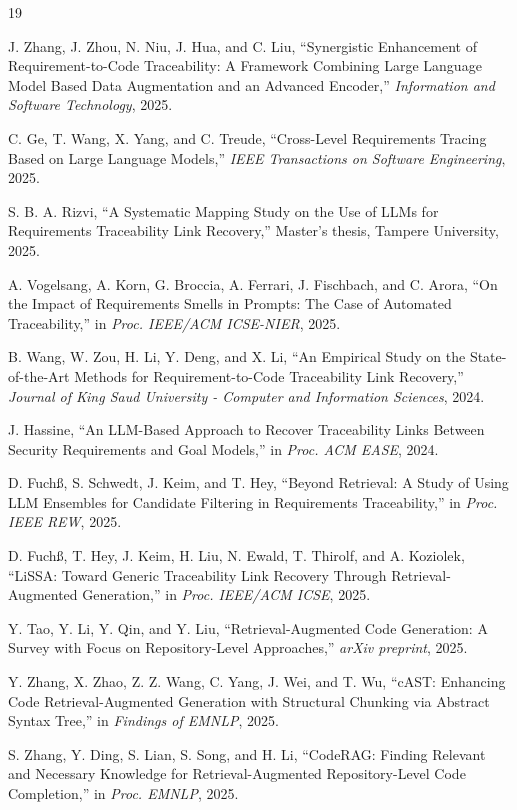 \documentclass[conference]{IEEEtran}
\begin{document}
\begin{thebibliography}{19}

J. Zhang, J. Zhou, N. Niu, J. Hua, and C. Liu, ``Synergistic Enhancement of Requirement-to-Code Traceability: A Framework Combining Large Language Model Based Data Augmentation and an Advanced Encoder,'' \textit{Information and Software Technology}, 2025.

C. Ge, T. Wang, X. Yang, and C. Treude, ``Cross-Level Requirements Tracing Based on Large Language Models,'' \textit{IEEE Transactions on Software Engineering}, 2025.

S. B. A. Rizvi, ``A Systematic Mapping Study on the Use of LLMs for Requirements Traceability Link Recovery,'' Master's thesis, Tampere University, 2025.

A. Vogelsang, A. Korn, G. Broccia, A. Ferrari, J. Fischbach, and C. Arora, ``On the Impact of Requirements Smells in Prompts: The Case of Automated Traceability,'' in \textit{Proc. IEEE/ACM ICSE-NIER}, 2025.

B. Wang, W. Zou, H. Li, Y. Deng, and X. Li, ``An Empirical Study on the State-of-the-Art Methods for Requirement-to-Code Traceability Link Recovery,'' \textit{Journal of King Saud University - Computer and Information Sciences}, 2024.

J. Hassine, ``An LLM-Based Approach to Recover Traceability Links Between Security Requirements and Goal Models,'' in \textit{Proc. ACM EASE}, 2024.

D. Fuch\ss, S. Schwedt, J. Keim, and T. Hey, ``Beyond Retrieval: A Study of Using LLM Ensembles for Candidate Filtering in Requirements Traceability,'' in \textit{Proc. IEEE REW}, 2025.

D. Fuch\ss, T. Hey, J. Keim, H. Liu, N. Ewald, T. Thirolf, and A. Koziolek, ``LiSSA: Toward Generic Traceability Link Recovery Through Retrieval-Augmented Generation,'' in \textit{Proc. IEEE/ACM ICSE}, 2025.

Y. Tao, Y. Li, Y. Qin, and Y. Liu, ``Retrieval-Augmented Code Generation: A Survey with Focus on Repository-Level Approaches,'' \textit{arXiv preprint}, 2025.

Y. Zhang, X. Zhao, Z. Z. Wang, C. Yang, J. Wei, and T. Wu, ``cAST: Enhancing Code Retrieval-Augmented Generation with Structural Chunking via Abstract Syntax Tree,'' in \textit{Findings of EMNLP}, 2025.

S. Zhang, Y. Ding, S. Lian, S. Song, and H. Li, ``CodeRAG: Finding Relevant and Necessary Knowledge for Retrieval-Augmented Repository-Level Code Completion,'' in \textit{Proc. EMNLP}, 2025.


\end{thebibliography}
\end{document}
